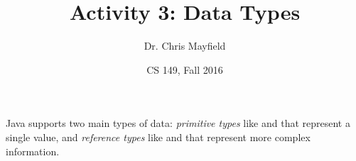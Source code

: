 \documentclass[12pt]{article}
\title{Activity 3: Data Types}
\author{Dr. Chris Mayfield}
\date{CS 149, Fall 2016}
\begin{document}
\maketitle

Java supports two main types of data: \emph{primitive types} like  and  that represent a single value, and \emph{reference types} like  and  that represent more complex information.




\end{document}
